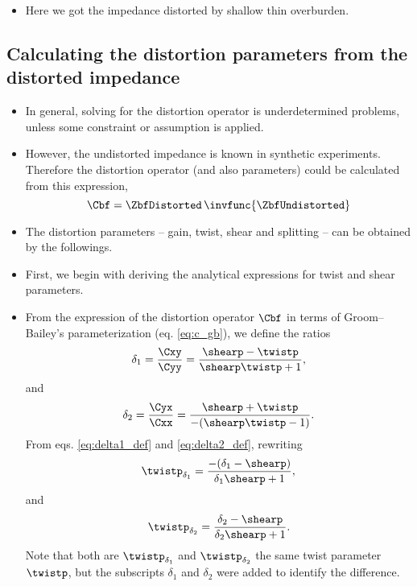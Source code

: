 \begin{itemize}
	\item Here we got the impedance distorted by shallow thin overburden.
\end{itemize}

\subsection{Calculating the distortion parameters from the distorted impedance}
\begin{itemize}
	\item In general, solving for the distortion operator is underdetermined problems, unless some constraint or assumption is applied.
	\item However, the undistorted impedance is known in synthetic experiments. Therefore the distortion operator (and also parameters) could be calculated from this expression, 
	\begin{equation}
		\Cbf = \ZbfDistorted\,\invfunc{\ZbfUndistorted}
	\end{equation}
	\item The distortion parameters -- gain, twist, shear and splitting -- can be obtained by the followings. 
	\item First, we begin with deriving the analytical expressions for twist and shear parameters.
	\item From the expression of the distortion operator $\Cbf$ in terms of Groom--Bailey's parameterization (eq. \ref{eq:c_gb}), we define the ratios 
	\begin{equation}\label{eq:delta1_def}
		\delta_1 = \frac{\Cxy}{\Cyy} = \frac{\shearp - \twistp}{\shearp\twistp+1},
	\end{equation}
	and
	\begin{equation}\label{eq:delta2_def}
		\delta_2 = \frac{\Cyx}{\Cxx} = \frac{\shearp + \twistp}{-(\shearp\twistp-1)}.	
	\end{equation}
	From eqs. \eqref{eq:delta1_def} and \eqref{eq:delta2_def}, rewriting 
	\begin{equation}\label{eq:twist_delta1_def}
		\twistp_{\delta_1} = \frac{-(\delta_1-\shearp)}{\delta_1\shearp+1},
	\end{equation}
	and
	\begin{equation}\label{eq:twist_delta2_def}
		\twistp_{\delta_2} = \frac{\delta_2-\shearp}{\delta_2\shearp+1}.
	\end{equation}
	Note that both are $\twistp_{\delta_1}$ and $\twistp_{\delta_2}$ the same twist parameter $\twistp$, but the subscripts $\delta_1$ and $\delta_2$ were added to identify the difference.

\end{itemize}
